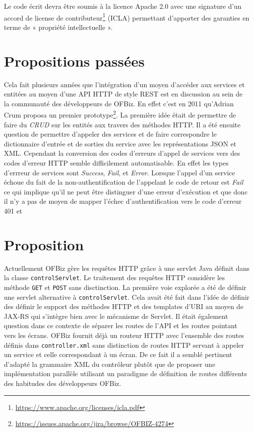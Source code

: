 \documentclass[a4paper, 11pt]{report}
\begin{document}
Le code écrit devra être soumis à la licence Apache 2.0 avec une
signature d'un accord de license de
contributeur\footnote{\url{https://www.apache.org/licenses/icla.pdf}} (ICLA)
permettant d'apporter des garanties en terme de « propriété
intellectuelle ».

\section{Propositions passées}

Cela fait plusieurs années que l'intégration d'un moyen d'accéder aux
services et entitées au moyen d'une API HTTP de style REST est en
discussion au sein de la communauté des développeurs de OFBiz. En
effet c'est en 2011 qu'Adrian Crum proposa un premier
prototype\footnote{\url{https://issues.apache.org/jira/browse/OFBIZ-4274}}. La
première idée était de permettre de faire du \emph{CRUD} sur les
entités aux travers des méthodes HTTP. Il a été ensuite question de
permettre d'appeler des services et de faire correspondre le
dictionnaire d'entrée et de sorties du service avec les
représentations JSON et XML. Cependant la conversion des codes
d'erreurs d'appel de services vers des codes d'erreur HTTP semble
difficilement automatisable. En effet les types d'errreur de services
sont \emph{Success}, \emph{Fail}, et \emph{Error}. Lorsque l'appel
d'un service échoue du fait de la non-authentification de l'appelant
le code de retour est \emph{Fail} ce qui implique qu'il ne peut être
distinguer d'une erreur d'exécution et que donc il n'y a pas de moyen
de mapper l'échec d'authentification vers le code d'erreur 401 et

\section{Proposition}

Actuellement OFBiz gère les requêtes HTTP grâce à une servlet Java
\cite{chan2017servlet} définit dans la classe \verb=controlServlet=.
Le traitement des requêtes HTTP considère les méthode \verb=GET= et
\verb=POST= sans disctinction. La première voie explorée a été de
définir une servlet alternative à \verb=controlServlet=. Cela avait
été fait dans l'idée de définir des définir le support des méthodes
HTTP et des templates d'URI au moyen de JAX-RS qui s'intègre bien avec
le mécanisme de Servlet. Il était également question dans ce contexte
de séparer les routes de l'API et les routes pointant vers les écrans.
OFBiz fournit déjà un routeur HTTP avec l'ensemble des routes définis
dans \verb=controller.xml= sans distinction de routes HTTP servant à
appeler un service et celle correspondant à un écran. De ce fait il a
semblé pertinent d'adapté la grammaire XML du contrôleur plutôt que de
proposer une implémentation parallèle utilisant un paradigme de
définition de routes différents des habitudes des développeurs OFBiz.
\end{document}
